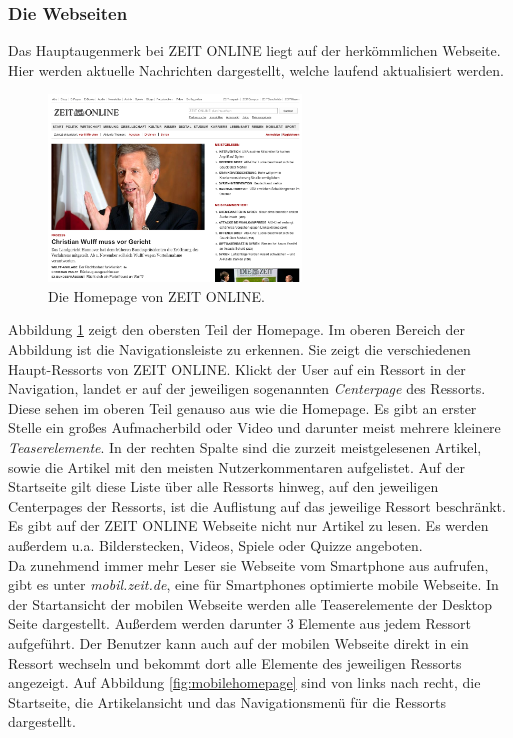 \documentclass[12pt,a4paper,bibtotoc,abstracton]{scrartcl}
\begin{document}
\subsubsection{Die Webseiten}
\label{subsubsec:webseiten}
Das Hauptaugenmerk bei ZEIT ONLINE liegt auf der herkömmlichen Webseite. Hier werden aktuelle Nachrichten dargestellt, welche laufend aktualisiert werden.

\begin{figure}[h]	
	\centering
	\includegraphics[width=0.6\textwidth]{Bilder/Screenshots/zeit.de/homepage.png} 
	\caption{Die Homepage von ZEIT ONLINE.}
	\label{fig:homepage}
\end{figure}

Abbildung \ref{fig:homepage} zeigt den obersten Teil der Homepage. Im oberen Bereich der Abbildung ist die Navigationsleiste zu erkennen. Sie zeigt die verschiedenen Haupt-Ressorts von ZEIT ONLINE. Klickt der User auf ein Ressort in der Navigation, landet er auf der jeweiligen sogenannten \textit{Centerpage} des Ressorts. Diese sehen im oberen Teil genauso aus wie die Homepage. Es gibt an erster Stelle ein großes Aufmacherbild oder Video und darunter meist mehrere kleinere \textit{Teaserelemente}. In der rechten Spalte sind die zurzeit meistgelesenen Artikel, sowie die Artikel mit den meisten Nutzerkommentaren aufgelistet. Auf der Startseite gilt diese Liste über alle Ressorts hinweg, auf den jeweiligen Centerpages der Ressorts, ist die Auflistung auf das jeweilige Ressort beschränkt.\\
Es gibt auf der ZEIT ONLINE Webseite nicht nur Artikel zu lesen. Es werden außerdem u.a. Bilderstecken, Videos, Spiele oder Quizze angeboten. \\

Da zunehmend immer mehr Leser sie Webseite vom Smartphone aus aufrufen, gibt es unter \textit{mobil.zeit.de}, eine für Smartphones optimierte mobile Webseite. In der Startansicht der mobilen Webseite werden alle Teaserelemente der Desktop Seite dargestellt. Außerdem werden darunter 3 Elemente aus jedem Ressort aufgeführt. Der Benutzer kann auch auf der mobilen Webseite direkt in ein Ressort wechseln und bekommt dort alle Elemente des jeweiligen Ressorts angezeigt. Auf Abbildung \ref{fig:mobilehomepage} sind von links nach recht, die Startseite, die Artikelansicht und das Navigationsmenü für die Ressorts dargestellt.
\end{document}
